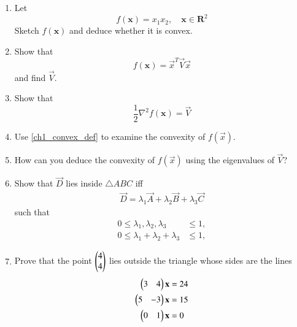 \begin{enumerate}[label=\arabic*.,ref=\thesection.\theenumi]
\item
Let 
\begin{equation}
f(\mathbf{x}) = x_1x_2, \quad \mathbf{x} \in \mathbf{R}^2
\end{equation}
Sketch $f(\mathbf{x})$ and deduce whether it is convex.
\item Show that 
\begin{equation}
f(\mathbf{x}) = \vec{x}^T\vec{V}\vec{x} 
\end{equation}
%
and find $\vec{V}$.
\item Show that 
\begin{equation}
\frac{1}{2}\nabla^2f(\mathbf{x}) = \vec{V}
\end{equation}

\item Use \eqref{ch1_convex_def} to examine the convexity of $f(\vec{x})$.
\item How can you deduce the convexity of $f(\vec{x})$ using the eigenvalues of $\vec{V}$?
\item Show that $\vec{D}$ lies inside $\triangle ABC$ iff
\begin{align}
\vec{D} = \lambda_1\vec{A} + \lambda_2\vec{B} + \lambda_3\vec{C}
\end{align}
such that
\begin{align}
0 \le \lambda_1, \lambda_2, \lambda_3 &\le 1,
\\
0 \le \lambda_1+\lambda_2+\lambda_3 &\le 1,
\end{align}
\item Prove that the point $\begin{pmatrix}4\\4\end{pmatrix}$ lies outside the triangle whose sides are the lines
\begin{align}
\begin{pmatrix}3&4\end{pmatrix} \mathbf{x}&= 24
\\
\begin{pmatrix} 5 & - 3\end{pmatrix} \mathbf{x}&= 15
\\
\begin{pmatrix}0 &1\end{pmatrix} \mathbf{x}&= 0
\end{align}


\end{enumerate}
%
